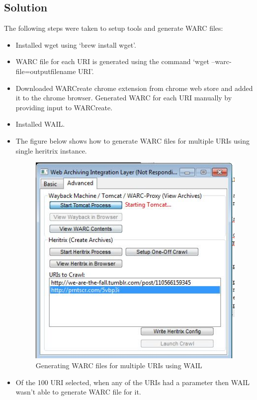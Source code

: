 \subsection{Solution}
The following steps were taken to setup tools and generate WARC files:
\begin{itemize}
	\item Installed wget using `brew install wget'.
	\item WARC file for each URI is generated using the command `wget --warc-file=outputfilename URI'.
	\item Downloaded WARCreate chrome extension from chrome web store and added it to the chrome browser. Generated WARC for each 
		  URI manually by providing input to WARCreate.
	\item Installed WAIL.
	\item The figure below shows how to generate WARC files for multiple URIs using single heritrix instance.
			\begin{figure}[ht]
			\begin{center}
				\includegraphics[scale=0.60]{WarcUsingWAIL.jpg}
				\caption{Generating WARC files for multiple URIs using WAIL}
			\end{center}
		\end{figure}	
	\item Of the 100 URI selected, when any of the URIs had a parameter then WAIL wasn't able to generate WARC file for it.
	

\end{itemize}
